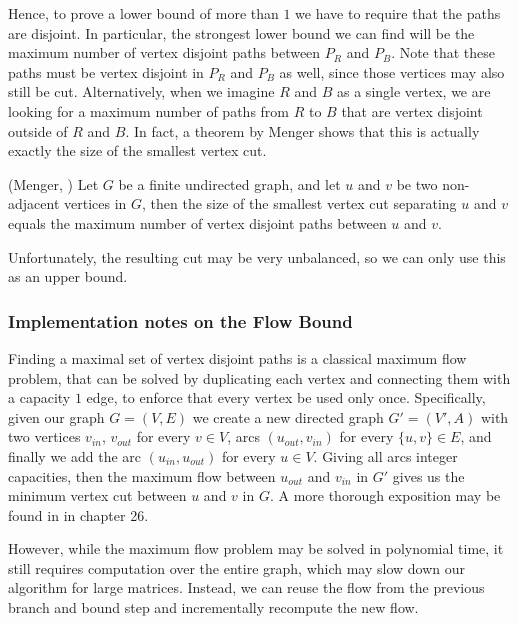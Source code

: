 	Hence, to prove a lower bound of more than $1$ we have to require that the
	paths are disjoint. In particular, the
	strongest lower bound we can find will be the maximum number of vertex
	disjoint paths between $P_R$ and $P_B$. Note that these paths must be
	vertex disjoint in $P_R$ and $P_B$ as well, since those vertices may also
	still be cut. Alternatively, when we imagine $R$ and $B$ as a single
	vertex, we are looking for a maximum number of paths from $R$ to $B$ that
	are vertex disjoint outside of $R$ and $B$. In fact, a theorem by Menger
	shows that this is actually exactly the size of the smallest vertex cut.

	\begin{theorem}{(Menger, \cite{menger1927allgemeinen})}
		Let $G$ be a finite undirected graph, and let $u$ and $v$ be two
		non-adjacent vertices in $G$, then the size of the smallest vertex cut
		separating $u$ and $v$ equals the maximum number of vertex disjoint
		paths between $u$ and $v$.
	\end{theorem}

	Unfortunately, the resulting cut may be very unbalanced, so we can only
	use this as an upper bound.

	\subsubsection{Implementation notes on the Flow Bound}

	Finding a maximal set of vertex disjoint paths is a classical maximum flow
	problem, that can be solved by duplicating each vertex and connecting them
	with a capacity $1$ edge, to enforce that every vertex be used only once.
	Specifically, given our graph $G = (V, E)$ we create
	a new directed graph $G' = (V', A)$ with two vertices $v_{in}$, $v_{out}$
	for every $v \in V$, arcs $(u_{out}, v_{in})$ for every $\{u, v\} \in E$,
	and finally we add the arc $(u_{in}, u_{out})$ for every $u \in V$.
	Giving all arcs integer capacities, then the maximum flow between
	$u_{out}$ and $v_{in}$ in $G'$ gives us the minimum vertex cut between
	$u$ and $v$ in $G$.
	A more thorough exposition may be found in \cite{thomas2001introduction}
	in chapter 26.

	However, while the maximum flow problem may be solved in polynomial time,
	it still requires computation over the entire graph, which may slow down
	our algorithm for large matrices. Instead, we can reuse the flow from the
	previous branch and bound step and incrementally recompute the new flow.

